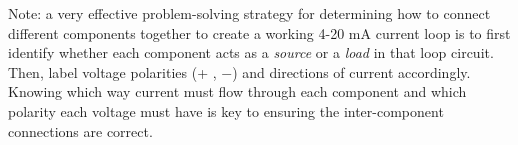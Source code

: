 \vskip 10pt

Note: a very effective problem-solving strategy for determining how to connect different components together to create a working 4-20 mA current loop is to first identify whether each component acts as a {\it source} or a {\it load} in that loop circuit.  Then, label voltage polarities (+ , $-$) and directions of current accordingly.  Knowing which way current must flow through each component and which polarity each voltage must have is key to ensuring the inter-component connections are correct.


















